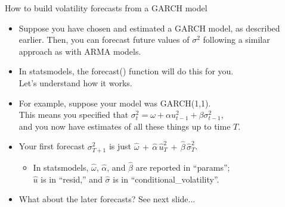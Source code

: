 \documentclass[t,12pt]{beamer}
\begin{document}
\begin{frame}[c]{How to build volatility forecasts from a GARCH model}
\begin{itemize}
\item Suppose you have chosen and estimated a GARCH model, as described earlier.
Then, you can forecast future values of $\sigma^2$ following a similar approach as with ARMA models.
\smallskip
\item In statsmodels, the forecast() function will do this for you. 
\\ Let's understand how it works.
\smallskip
\item For example, suppose your model was GARCH(1,1).
\\ This means you specified that $\sigma_t^2 = \omega + \alpha u_{t-1}^2 + \beta \sigma_{t-1}^2$,
\\ and you now have estimates of all these things up to time $T$.
\smallskip
\item Your first forecast $\sigma_{T+1}^2$ is just $\hat{\omega} \, + \, \hat{\alpha} \, \hat{u}_T^2 \, + \, \hat{\beta} \, \hat{\sigma}_T^2$.
\begin{itemize}
\item In statsmodels, $\hat{\omega}$, $\hat{\alpha}$, and $\hat{\beta}$ are reported in ``params'';
\\ $\hat{u}$ is in ``resid,'' and $\hat{\sigma}$ is in ``conditional\_volatility''.
\end{itemize}
\smallskip
\item What about the later forecasts? See next slide...
\end{itemize}
\end{frame}
\end{document}
